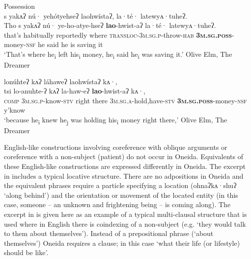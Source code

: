 \documentclass[output=paper]{langscibook}
\begin{document}

\ea%
    \label{ex:oneida:28}
  
   \ea \label{ex:oneida:28a}
   Possession\\
    {s} {yakʌʔ} {nú·} {yehótyehseʔ} {laohwístaʔ,} {la·té·} {latewyʌ·tuheʔ.}\\
   {Tho} {s} {yakʌʔ} {nú·} ye-ho-atye-hseʔ \textbf{lao}-hwist-aʔ {la·té·} {latewyʌ·tuheʔ.}\\
    that’s   habitually   reportedly   where \textsc{transloc-3m.sg.p-}throw\textsc{-hab}   \textbf{\textsc{3m.sg.poss}}\textsc{-}money\textsc{-nsf} he said  he is saving it\\
    \glt ‘That’s where he\textsubscript{i} left his\textsubscript{i} money, he\textsubscript{i} said he\textsubscript{i} was saving it.’ Olive Elm, {The} {Dreamer}
    
    \ex 
    \label{ex:oneida:28b}
     {lonúhteʔ} {kʌʔ} {láhaweʔ} {laohwístaʔ} {kʌ·,}\\
    tsi lo-anuhte-ʔ kʌʔ la-haw-eʔ \textbf{lao}-hwist-aʔ kʌ·,\\
    \textsc{comp} \textsc{3m.sg.p-}know\textsc{{}-stv} {right there} \textsc{3m.sg.a-}hold,have\textsc{-stv} \textbf{\textsc{3m.sg.poss}}\textsc{-}money\textsc{-nsf}  y’know \\
   \glt ‘because he\textsubscript{i} knew he\textsubscript{j} was holding his\textsubscript{i} money right there,’ Olive Elm, {The} {Dreamer}
\z
\z

English-like constructions involving coreference with oblique arguments or coreference with a non-subject (patient) do not occur in Oneida. Equivalents of these English-like constructions are expressed differently in Oneida. The excerpt in  includes a typical locative structure. There are no adpositions in Oneida and the equivalent phrases require a particle specifying a location ({ohnaʔkʌ·shuʔ}  ‘along behind’) and the orientation or movement of the located entity (in this case, someone – an unknown and frightening being – is coming along). The excerpt in  is given here as an example of a typical multi-clausal structure that is used where in English there is coindexing of a non-subject (e.g. ‘they would talk to them about themselves’). Instead of a prepositional phrase (‘about themselves’) Oneida requires a clause; in this case ‘what their life (or lifestyle) should be like’.
\end{document}

